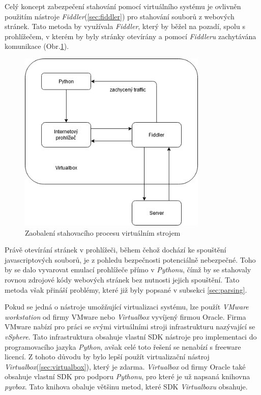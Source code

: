 \documentclass[thesis=M,czech,hidelinks]{FITthesis}[2013/05/06]
\begin{document}
Celý koncept zabezpečení stahování pomocí virtuálního systému je ovlivněn použitím nástroje \textit{Fiddler}(\ref{sec:fiddler}) pro stahování souborů z webových stránek. Tato metoda by využívala \textit{Fiddler}, který by běžel na pozadí, spolu s prohlížečem, v kterém by byly stránky otevírány a pomocí \textit{Fiddleru} zachytávána komunikace (Obr.\ref{fig:virtualbox}). 
\begin{figure}[h]
	\centering
	\includegraphics[width=9cm]{pictures/virtualbox.png}
	\caption{Zaobalení stahovacího procesu virtuálním strojem}
	\label{fig:virtualbox}
\end{figure}
Právě otevírání stránek v prohlížeči, během čehož dochází ke spouštění javascriptových souborů, je z pohledu bezpečnosti potenciálně nebezpečné. Toho by se dalo vyvarovat emulací prohlížeče přímo v \textit{Pythonu}, čímž by se stahovaly rovnou zdrojové kódy webových stránek bez nutnosti jejich spouštění. Tato metoda však přináší problémy, které již byly popsané v subsekci \ref{sec:parsing}.

Pokud se jedná o nástroje umožňující virtualizaci systému, lze použít \textit{VMware workstation} od firmy VMware nebo \textit{Virtualbox} vyvíjený firmou Oracle. Firma VMware nabízí pro práci se svými virtuálními stroji infrastrukturu nazývající se \textit{vSphere}. Tato infrastruktura obsahuje vlastní SDK nástroje pro implementaci do programovacího jazyka \textit{Python}\cite{vmware}, avšak celé toto řešení se nenabízí s freeware licencí. Z tohoto důvodu by bylo lepší použít virtualizační nástroj \textit{Virtualbox}(\ref{sec:virtualbox}), který je zdarma. \textit{Virtualbox} od firmy Oracle také obsahuje vlastní SDK pro podporu \textit{Pythonu}, pro které je už napsaná knihovna \textit{pyvbox}\cite{pyvbox}. Tato knihova obaluje většinu metod, které SDK \textit{Virtualboxu} obsahuje. 
\end{document}
